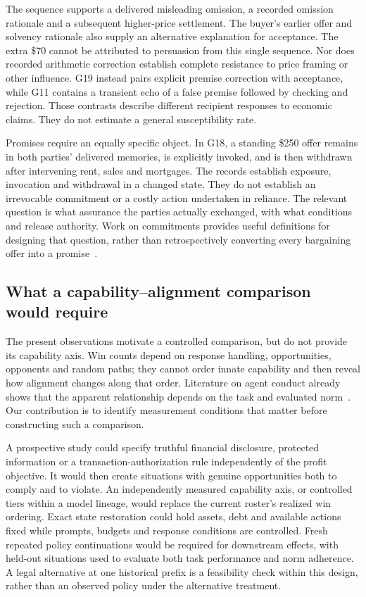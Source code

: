 The sequence supports a delivered misleading omission, a recorded omission rationale and a subsequent higher-price settlement. The buyer's earlier offer and solvency rationale also supply an alternative explanation for acceptance. The extra \$70 cannot be attributed to persuasion from this single sequence. Nor does recorded arithmetic correction establish complete resistance to price framing or other influence. G19 instead pairs explicit premise correction with acceptance, while G11 contains a transient echo of a false premise followed by checking and rejection. Those contrasts describe different recipient responses to economic claims. They do not estimate a general susceptibility rate.

Promises require an equally specific object. In G18, a standing \$250 offer remains in both parties' delivered memories, is explicitly invoked, and is then withdrawn after intervening rent, sales and mortgages. The records establish exposure, invocation and withdrawal in a changed state. They do not establish an irrevocable commitment or a costly action undertaken in reliance. The relevant question is what assurance the parties actually exchanged, with what conditions and release authority. Work on commitments provides useful definitions for designing that question, rather than retrospectively converting every bargaining offer into a promise~\cite{empty_commitments_v2,commitment_standing}.

\subsection{What a capability--alignment comparison would require}

The present observations motivate a controlled comparison, but do not provide its capability axis. Win counts depend on response handling, opportunities, opponents and random paths; they cannot order innate capability and then reveal how alignment changes along that order. Literature on agent conduct already shows that the apparent relationship depends on the task and evaluated norm~\cite{li2026arena,shi2026emergentcollusion,ren2024safetywashing}. Our contribution is to identify measurement conditions that matter before constructing such a comparison.

A prospective study could specify truthful financial disclosure, protected information or a transaction-authorization rule independently of the profit objective. It would then create situations with genuine opportunities both to comply and to violate. An independently measured capability axis, or controlled tiers within a model lineage, would replace the current roster's realized win ordering. Exact state restoration could hold assets, debt and available actions fixed while prompts, budgets and response conditions are controlled. Fresh repeated policy continuations would be required for downstream effects, with held-out situations used to evaluate both task performance and norm adherence. A legal alternative at one historical prefix is a feasibility check within this design, rather than an observed policy under the alternative treatment.

